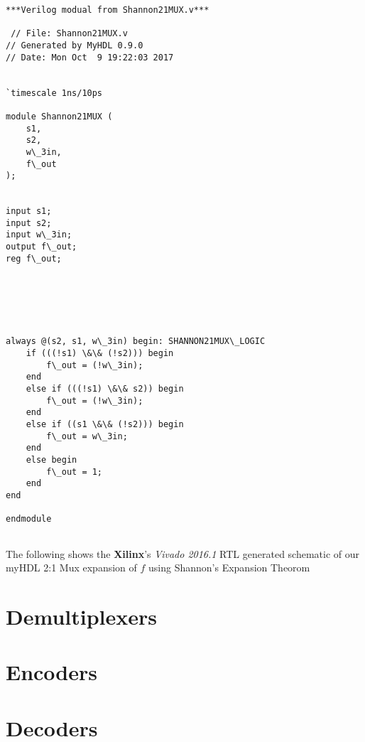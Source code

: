 \documentclass[11pt]{article}
\begin{document}
    \begin{Verbatim}[commandchars=\\\{\}]
***Verilog modual from Shannon21MUX.v***

 // File: Shannon21MUX.v
// Generated by MyHDL 0.9.0
// Date: Mon Oct  9 19:22:03 2017


`timescale 1ns/10ps

module Shannon21MUX (
    s1,
    s2,
    w\_3in,
    f\_out
);


input s1;
input s2;
input w\_3in;
output f\_out;
reg f\_out;






always @(s2, s1, w\_3in) begin: SHANNON21MUX\_LOGIC
    if (((!s1) \&\& (!s2))) begin
        f\_out = (!w\_3in);
    end
    else if (((!s1) \&\& s2)) begin
        f\_out = (!w\_3in);
    end
    else if ((s1 \&\& (!s2))) begin
        f\_out = w\_3in;
    end
    else begin
        f\_out = 1;
    end
end

endmodule


    \end{Verbatim}

    The following shows the \textbf{Xilinx}'s \emph{Vivado 2016.1} RTL
generated schematic of our myHDL 2:1 Mux expansion of \(f\) using
Shannon's Expansion Theorom 

    \section{Demultiplexers}\label{demultiplexers}

    \section{Encoders}\label{encoders}

    \section{Decoders}\label{decoders}


    
    
    
    
\end{document}
